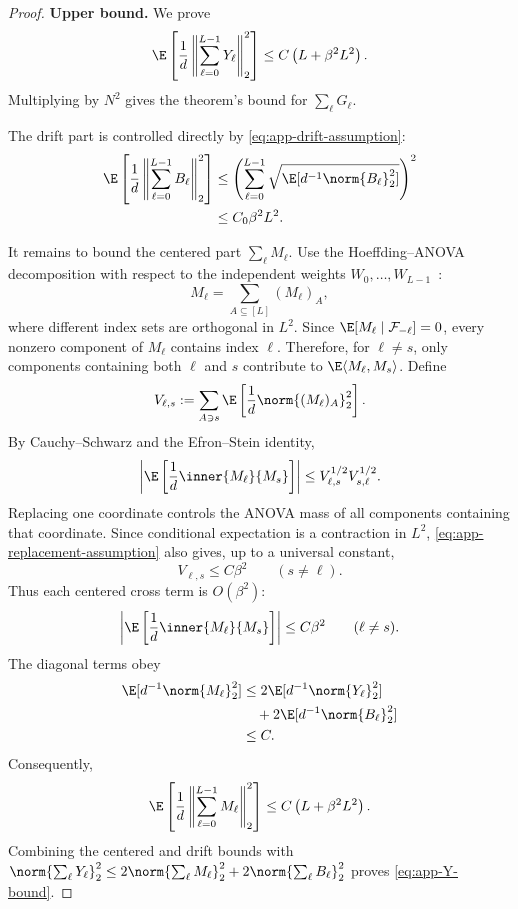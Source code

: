 \begin{proof}

\noindent\textbf{Upper bound.}
We prove
\begin{equation}
  \E\left[
  \frac{1}{d}
  \left\|
  \sum_{\ell=0}^{L-1}Y_\ell
  \right\|_2^2
  \right]
  \le
  C\left(L+\beta^2L^2\right).
  \label{eq:app-Y-bound}
\end{equation}
Multiplying by $N^2$ gives the theorem's bound for $\sum_\ell G_\ell$.

The drift part is controlled directly by \eqref{eq:app-drift-assumption}:
\[
  \begin{aligned}
  \E\left[
  \frac{1}{d}
  \left\|
  \sum_{\ell=0}^{L-1}B_\ell
  \right\|_2^2
  \right]
  &\le
  \left(
  \sum_{\ell=0}^{L-1}
  \sqrt{\E[d^{-1}\norm{B_\ell}_2^2]}
  \right)^2\\
  &\le
  C_0\beta^2L^2.
  \end{aligned}
\]

It remains to bound the centered part $\sum_\ell M_\ell$. Use the Hoeffding--ANOVA decomposition with respect to the independent weights $W_0,\dots,W_{L-1}$~\citep{DBLP:books/daglib/0035704}:
\[
  M_\ell=\sum_{A\subseteq[L]}(M_\ell)_A,
\]
where different index sets are orthogonal in $L^2$. Since $\E[M_\ell\mid\mathcal F_{-\ell}]=0$, every nonzero component of $M_\ell$ contains index $\ell$. Therefore, for $\ell\ne s$, only components containing both $\ell$ and $s$ contribute to $\E\langle M_\ell,M_s\rangle$.
Define
\[
  V_{\ell,s}
  :=
  \sum_{A\ni s}
  \E\left[\frac{1}{d}\norm{(M_\ell)_A}_2^2\right].
\]
By Cauchy--Schwarz and the Efron--Stein identity,
\[
  \left|
  \E\left[\frac{1}{d}\inner{M_\ell}{M_s}\right]
  \right|
  \le
  V_{\ell,s}^{1/2}V_{s,\ell}^{1/2}.
\]
Replacing one coordinate controls the ANOVA mass of all components containing that coordinate. Since conditional expectation is a contraction in $L^2$, \eqref{eq:app-replacement-assumption} also gives, up to a universal constant,
\[
  V_{\ell,s}\le C\beta^2
  \qquad (s\ne \ell).
\]
Thus each centered cross term is $O(\beta^2)$:
\begin{equation}
  \left|
  \E\left[\frac{1}{d}\inner{M_\ell}{M_s}\right]
  \right|
  \le
  C\beta^2
  \qquad (\ell\ne s).
  \label{eq:app-centered-cross}
\end{equation}
The diagonal terms obey
\[
  \begin{aligned}
  \E[d^{-1}\norm{M_\ell}_2^2]
  &\le
  2\E[d^{-1}\norm{Y_\ell}_2^2]\\
  &\quad+
  2\E[d^{-1}\norm{B_\ell}_2^2]\\
  &\le
  C.
  \end{aligned}
\]
Consequently,
\[
  \E\left[
  \frac{1}{d}
  \left\|
  \sum_{\ell=0}^{L-1}M_\ell
  \right\|_2^2
  \right]
  \le
  C\left(L+\beta^2L^2\right).
\]
Combining the centered and drift bounds with
$\norm{\sum_\ell Y_\ell}_2^2\le 2\norm{\sum_\ell M_\ell}_2^2+2\norm{\sum_\ell B_\ell}_2^2$
proves \eqref{eq:app-Y-bound}.


\end{proof}
